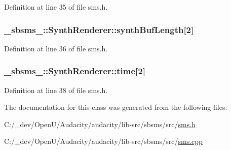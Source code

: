 Definition at line 35 of file sms.\+h.

\subsubsection[{\texorpdfstring{synth\+Buf\+Length}{synthBufLength}}]{ \+\_\+sbsms\+\_\+\+::\+Synth\+Renderer\+::synth\+Buf\+Length\mbox{[}2\mbox{]}\hspace{0.3cm}{\ttfamily [protected]}}\hypertarget{class__sbsms___1_1_synth_renderer_a89ea2c5a7162f93b430153158e70d525}{}\label{class__sbsms___1_1_synth_renderer_a89ea2c5a7162f93b430153158e70d525}


Definition at line 36 of file sms.\+h.

\subsubsection[{\texorpdfstring{time}{time}}]{ \+\_\+sbsms\+\_\+\+::\+Synth\+Renderer\+::time\mbox{[}2\mbox{]}\hspace{0.3cm}{\ttfamily [protected]}}\hypertarget{class__sbsms___1_1_synth_renderer_a49e3d5e398cb2cfdd5eb021792107209}{}\label{class__sbsms___1_1_synth_renderer_a49e3d5e398cb2cfdd5eb021792107209}


Definition at line 38 of file sms.\+h.



The documentation for this class was generated from the following files\+:\begin{DoxyCompactItemize}
\item 
C\+:/\+\_\+dev/\+Open\+U/\+Audacity/audacity/lib-\/src/sbsms/src/\hyperlink{sms_8h}{sms.\+h}\item 
C\+:/\+\_\+dev/\+Open\+U/\+Audacity/audacity/lib-\/src/sbsms/src/\hyperlink{sms_8cpp}{sms.\+cpp}\end{DoxyCompactItemize}
